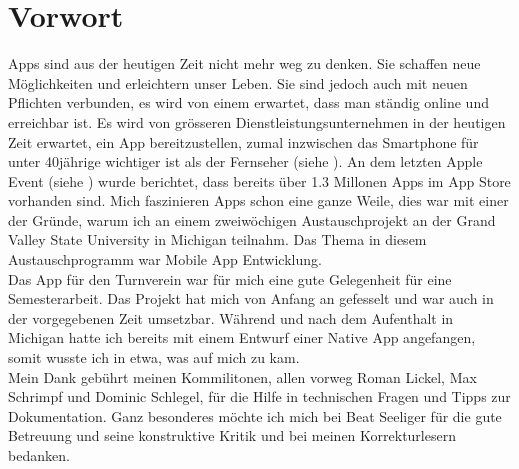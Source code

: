 \chapter*{Vorwort}\label{vorwort}
Apps sind aus der heutigen Zeit nicht mehr weg zu denken. Sie schaffen neue Möglichkeiten und erleichtern unser Leben. Sie sind jedoch auch mit neuen Pflichten verbunden, es wird von einem erwartet, dass man ständig online und erreichbar ist. Es wird von grösseren Dienstleistungsunternehmen in der heutigen Zeit erwartet, ein App bereitzustellen, zumal inzwischen das Smartphone für unter 40jährige wichtiger ist als der Fernseher (siehe \cite{digitalisierungsbericht2014}). An dem letzten Apple Event (siehe \cite{apple_event_sept_2014}) wurde berichtet, dass bereits über 1.3 Millonen Apps im App Store vorhanden sind. Mich faszinieren Apps schon eine ganze Weile, dies war mit einer der Gründe, warum ich an einem zweiwöchigen Austauschprojekt an der Grand Valley State University in Michigan teilnahm. Das Thema in diesem Austauschprogramm war Mobile App Entwicklung.\\

Das App für den Turnverein war für mich eine gute Gelegenheit für eine Semesterarbeit. Das Projekt hat mich von Anfang an gefesselt und war auch in der vorgegebenen Zeit umsetzbar. Während und nach dem Aufenthalt in Michigan hatte ich bereits mit einem Entwurf einer Native App angefangen, somit wusste ich in etwa, was auf mich zu kam.\\

Mein Dank gebührt meinen Kommilitonen, allen vorweg Roman Lickel, Max Schrimpf und Dominic Schlegel, für die Hilfe in technischen Fragen und Tipps zur Dokumentation. Ganz besonderes möchte ich mich bei Beat Seeliger für die gute Betreuung und seine konstruktive Kritik und bei meinen Korrekturlesern bedanken.